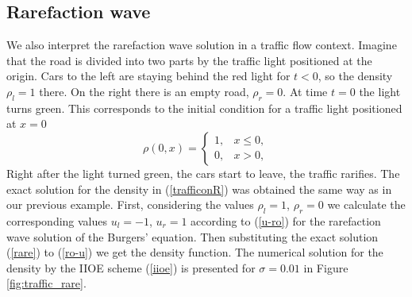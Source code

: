 \documentclass[a4paper,12pt,twoside]{report}%
\begin{document}
\subsection{Rarefaction wave}
We also interpret the rarefaction wave solution in a traffic flow context. Imagine that the road is divided into two parts by the traffic light positioned at the origin. Cars to the left are staying behind the red light for $ t<0 $, so the density $ \rho_l = 1 $ there. On the right there is an empty road, $ \rho_r = 0 $. At time $ t = 0 $ the light turns green. This corresponds to the initial condition for a traffic light positioned at $ x = 0 $
\begin{equation}
	\rho(0,x) =
	\begin{cases}
		1, &x\leq 0,\nonumber\\
		0, &x>0,\nonumber
	\end{cases}
\end{equation}
Right after the light turned green, the cars start to leave, the traffic rarifies. The exact solution for the density in (\ref{trafficonR}) was obtained the same way as in our previous example. First, considering the values $ \rho_l = 1 $, $ \rho_r = 0 $ we calculate the corresponding values $ u_l = -1 $, $ u_r = 1 $ according to (\ref{u-ro}) for the rarefaction wave solution of the Burgers' equation. Then substituting the exact solution (\ref{rare}) to (\ref{ro-u}) we get the density function. The numerical solution for the density by the IIOE scheme (\ref{iioe}) is presented for $ \sigma = 0.01 $ in Figure \ref{fig:traffic_rare}.
\end{document}
